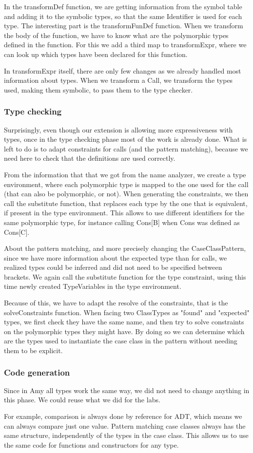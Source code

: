 In the transformDef function, we are getting information from the symbol table and adding it to the symbolic types, so that the same Identifier is used for each type. The interesting part is the transformFunDef function. When we transform the body of the function, we have to know what are the polymorphic types defined in the function. For this we add a third map to transformExpr, where we can look up which types have been declared for this function.

In transformExpr itself, there are only few changes as we already handled most information about types. When we transform a Call, we transform the types used, making them symbolic, to pass them to the type checker.
\subsubsection{Type checking}
Surprisingly, even though our extension is allowing more expressiveness with types, once in the type checking phase most of the work is already done. What is left to do is to adapt constraints for calls (and the pattern matching), because we need here to check that the definitions are used correctly. 

From the information that that we got from the name analyzer, we create a type environment, where each polymorphic type is mapped to the one used for the call (that can also be polymorphic, or not). When generating the constraints, we then call the substitute function, that replaces each type by the one that is equivalent, if present in the type environment. This allows to use different identifiers for the same polymorphic type, for instance calling Cons[B] when Cons was defined as Cons[C].

About the pattern matching, and more precisely changing the CaseClassPattern, since we have more information about the expected type than for calls, we realized types could be inferred and did not need to be specified between brackets. We again call the substitute function for the type constraint, using this time newly created TypeVariables in the type environment. 

Because of this, we have to adapt the resolve of the constraints, that is the solveConstraints function. When facing two ClassTypes as "found" and "expected" types, we first check they have the same name, and then try to solve constraints on the polymorphic types they might have. By doing so we can determine which are the types used to instantiate the case class in the pattern without needing them to be explicit.
\subsubsection{Code generation}
Since in Amy all types work the same way, we did not need to change anything in this phase. We could reuse what we did for the labs.

For example, comparison is always done by reference for ADT, which means we can always compare just one value. Pattern matching case classes always has the same structure, independently of the types in the case class. This allows us to use the same code for functions and constructors for any type.
